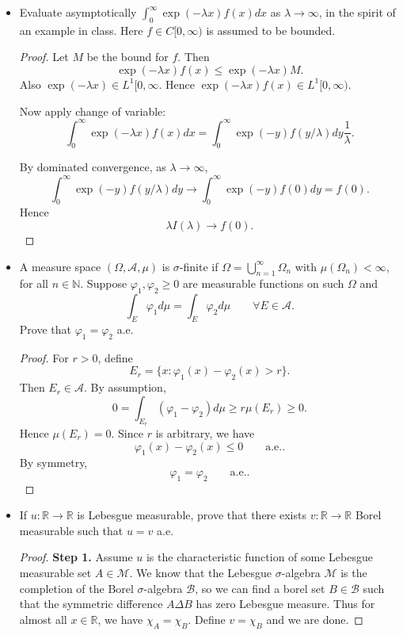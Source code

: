 
\begin{itemize}
	\item Evaluate asymptotically $\int _0^\infty \exp{(- \lambda x)} f(x) dx$ as $\lambda \to  \infty $, in the spirit of an example in class. Here $f \in C[0, \infty )$ is assumed to be bounded.
\begin{proof}
	Let $M$ be the bound for $f$. Then
	\[
		\exp ( - \lambda x) f(x) \le  \exp(- \lambda x) M
	.\] 
	Also $\exp(- \lambda x) \in L^1[0, \infty$. Hence $\exp( - \lambda x) f(x) \in L^1[0, \infty )$.

	Now apply change of variable:
	\[
		\int _0^\infty  \exp( - \lambda x) f(x) dx = \int _0^\infty \exp( - y) f(y / \lambda) dy \frac{1}{\lambda}
	.\] 
	
	By dominated convergence, as $\lambda \to  \infty $,
	\[
		\int_0^\infty  \exp(-y) f(y / \lambda) d y \to  \int _0^\infty  \exp(-y) f(0) dy = f(0)
	.\] 
	Hence
	\[
		\lambda I(\lambda) \to f(0)
	.\] 
\end{proof}

	\item A measure space $(\Omega, \mathcal{A}, \mu)$ is $\sigma$-finite if $\Omega = \bigcup_{n = 1} ^{\infty }  \Omega_n$ with $\mu(\Omega_n) < \infty $, for all $n \in \mathbb{N}$. Suppose $\varphi_1, \varphi_2 \ge 0$ are measurable functions on such $\Omega$ and 
		\[
			\int _E \varphi_1 d\mu = \int _E \varphi_2 d \mu \qquad \forall  E \in \mathcal{A}
		.\] 
		Prove that $\varphi_1 = \varphi_2$ a.e.
\begin{proof}
	For $r > 0$, define
	\[
		E_r = \{x: \varphi_1(x) - \varphi_2(x) > r\} 
	.\] 
	Then $E_r \in \mathcal{A}$. By assumption,
	\[
		0 = \int _{E_r} (\varphi_1 - \varphi_2) d \mu \ge  r \mu(E_r) \ge 0
	.\] 
	Hence $\mu(E_r) = 0$. Since $r$ is arbitrary, we have
	\[
		\varphi_1(x) - \varphi_2(x) \le  0 \qquad \text{a.e.}
	.\] 
	By symmetry,
	\[
		\varphi_1 = \varphi_2 \qquad \text{a.e.}
	.\] 
\end{proof}

	\item If $u: \mathbb{R}\to \mathbb{R}$ is Lebesgue measurable, prove that there exists $v : \mathbb{R} \to  \mathbb{R}$ Borel measurable such that $u = v $ a.e.
\begin{proof}
	\textbf{Step 1.} Assume $u$ is the characteristic function of some Lebesgue measurable set $A \in \mathcal{M}$. We know that the Lebesgue $\sigma$-algebra $\mathcal{M}$ is the completion of the Borel $\sigma$-algebra $\mathcal{B}$, so we can find a borel set $B \in \mathcal{B}$ such that the symmetric difference $A \Delta B$ has zero Lebesgue measure. Thus for almost all $x \in \mathbb{R}$, we have $\chi_A = \chi_B$. Define $v = \chi_B$ and we are done.


\end{proof}
\end{itemize}
